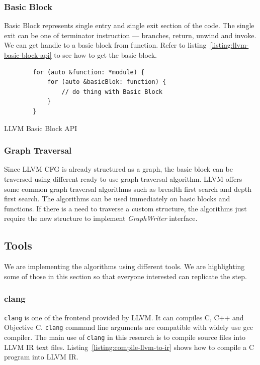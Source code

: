 \subsubsection{Basic Block}

Basic Block represents single entry and single exit section of the code. The
single exit can be one of terminator instruction — branches, return, unwind and
invoke. We can get handle to a basic block from function. Refer to
listing~\ref{listing:llvm-basic-block-api} to see how to get the basic block.

\begin{listing}[htbp]
    \begin{verbatim}
        for (auto &function: *module) {
            for (auto &basicBlok: function) {
                // do thing with Basic Block
            }
        }
    \end{verbatim}
    \caption{LLVM Basic Block API}    
    \label{listing:llvm-basic-block-api}
\end{listing}

\subsubsection{Graph Traversal}

Since LLVM CFG is already structured as a graph, the basic block can be
traversed using different ready to use graph traversal algorithm. LLVM offers
some common graph traversal algorithms such as breadth first search and depth
first search. The algorithms can be used immediately on basic blocks and
functions. If there is a need to traverse a custom structure, the algorithms
just require the new structure to implement \emph{GraphWriter} interface.

\subsection{Tools}

We are implementing the algorithms using different tools. We are highlighting
some of those in this section so that everyone interested can replicate the
step.

\subsubsection{clang}

\texttt{clang} is one of the frontend provided by LLVM. It can compiles C, C++
and Objective C. \texttt{clang} command line arguments are compatible with
widely use gcc compiler. The main use of \texttt{clang} in this research is to
compile source files into LLVM IR text files.
Listing~\ref{listing:compile-llvm-to-ir} shows how to compile a C program into
LLVM IR. 

